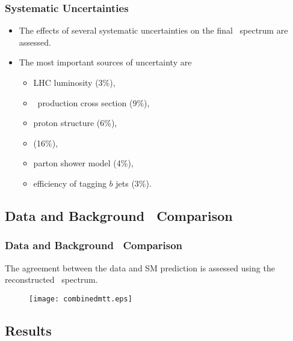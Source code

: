 \begin{frame}[label=systematics]
    \frametitle{Systematic Uncertainties}
    \begin{itemize}
        \item The effects of several systematic uncertainties on the
            final \mtt\ spectrum are assessed.
        \item The most important sources of uncertainty are
        \begin{itemize}
            \item LHC luminosity (3\%),
            \item \ttbar\ production cross section (9\%),
            \item proton structure (6\%),
            \item {} (16\%),
            \item parton shower model (4\%),
            \item efficiency of tagging $b$ jets (3\%).
        \end{itemize}
    \end{itemize}
\end{frame}

\subsection{Data and Background \mtt\ Comparison}

\begin{frame}
\frametitle{Data and Background \mtt\ Comparison}
    \centering
The agreement between the data and SM prediction is assessed using the
reconstructed \mtt\ spectrum.
\begin{figure}
\texttt{[image: combinedmtt.eps]}
\end{figure}
\end{frame}


\subsection{Results}


